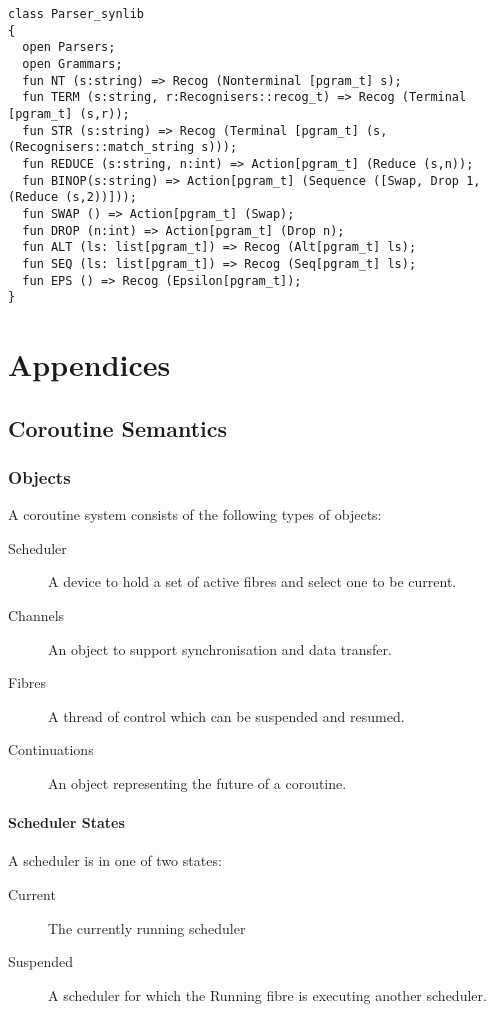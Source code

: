 \documentclass[oneside]{book}
\begin{document}
\begin{verbatim}
class Parser_synlib
{
  open Parsers;
  open Grammars;
  fun NT (s:string) => Recog (Nonterminal [pgram_t] s);
  fun TERM (s:string, r:Recognisers::recog_t) => Recog (Terminal [pgram_t] (s,r));
  fun STR (s:string) => Recog (Terminal [pgram_t] (s, (Recognisers::match_string s)));
  fun REDUCE (s:string, n:int) => Action[pgram_t] (Reduce (s,n));
  fun BINOP(s:string) => Action[pgram_t] (Sequence ([Swap, Drop 1, (Reduce (s,2))]));
  fun SWAP () => Action[pgram_t] (Swap);
  fun DROP (n:int) => Action[pgram_t] (Drop n);
  fun ALT (ls: list[pgram_t]) => Recog (Alt[pgram_t] ls);
  fun SEQ (ls: list[pgram_t]) => Recog (Seq[pgram_t] ls);
  fun EPS () => Recog (Epsilon[pgram_t]);
}
\end{verbatim}


\part{Appendices}
\chapter{Coroutine Semantics}
\label{Coroutine Semantics}
\section{Objects}
A coroutine system consists of the following types of objects:
\begin{description}
\item[Scheduler] A device to hold a set of active fibres and
select one to be current.
\item[Channels] An object to support synchronisation and data transfer.
\item[Fibres] A thread of control which can be suspended and resumed.
\item[Continuations] An object representing the future of a coroutine.
\end{description}

\subsection{Scheduler States}
A scheduler is in one of two states:
\begin{description}
\item[Current] The currently running scheduler
\item[Suspended] A scheduler for which the Running fibre is
executing another scheduler.
\end{description}
\end{document}
